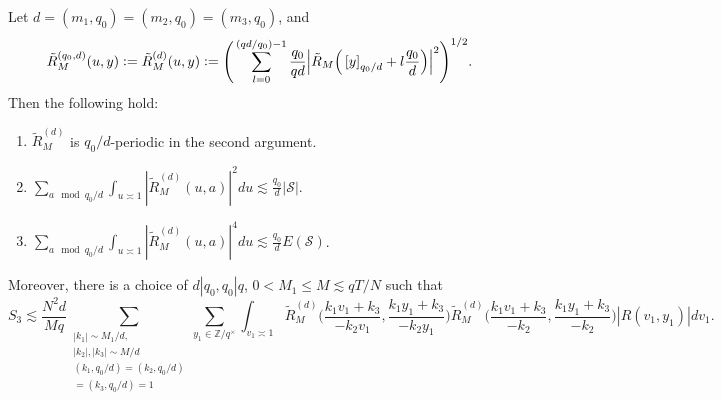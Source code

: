 \begin{proposition}
    Let $d=(m_1,q_0)=(m_2,q_0)=(m_3,q_0)$, and
    \[
        \tilde{R}^{(q_0,d)}_M(u,y) \mathrel{\mathop:}= \tilde{R}^{(d)}_M(u,y) \mathrel{\mathop:}=  \Bigg(\sum_{l=0}^{(qd/q_0)-1} \frac{q_0}{qd} \Big|\tilde{R}_M\Big(\left[y\right]_{q_0/d} + l \frac{q_0}{d}\Big)\Big|^2\Bigg)^{1/2}.
    \]
    Then the following hold:\begin{enumerate}
        \item $\tilde{R}^{(d)}_M$ is $q_0/d$-periodic in the second argument.
        \item $\sum_{a\mod q_0/d} \int_{u\asymp 1 }|\tilde{R}^{(d)}_M(u,a)|^2 du\lesssim\frac{q_0}{d}|\mathcal{S}|$.
        \item $\sum_{a\mod q_0/d} \int_{u\asymp 1 }|\tilde{R}^{(d)}_M(u,a)|^4 du\lesssim\frac{q_0}{d}E(\mathcal{S})$.
    \end{enumerate}
    Moreover, there is a choice of $d|q_0, q_0|q$, $0<M_1\leq M\lesssim qT/N$ such that  \[
        S_3\lesssim \frac{N^2d}{Mq}
        \sum_{\substack{|k_1|\sim M_1/d,\\|k_2|,|k_3|\sim M/d\\
        (k_1,q_0/d)=(k_2,q_0/d)\\=(k_3,q_0/d)=1}} \sum_{y_1\in \mathbb{Z}/q^\times} \int_{v_1\asymp 1}
        \tilde{R}_M^{(d)}\Big(\frac{k_1v_1+k_3}{-k_2v_1},\frac{k_1y_1+k_3}{-k_2y_1}\Big)\tilde{R}_M^{(d)}\Big(\frac{k_1v_1+k_3}{-k_2},\frac{k_1y_1+k_3}{-k_2}\Big) |R(v_1,y_1)|dv_1.
    \]
\end{proposition}\ 
\\ \ 
